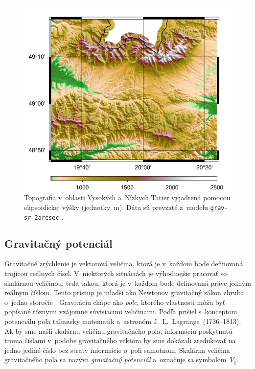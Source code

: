 \documentclass[a4paper, 12pt]{book}
\newcommand{\gidx}{\mathrm g}
\begin{document}
\begin{figure}
\centering
\includegraphics{./fig-h-grav-sr-2arcsec.pdf}
\caption{Topografia v~oblasti Vysokých a~Nízkych Tatier vyjadrená pomocou 
elipsoidickej výšky (jednotky~m).  Dáta sú prevzaté z~modelu 
\texttt{grav-sr-2arcsec} \parencite{GravSR2arcsec}.}
\label{fig:h_grav_sr_2arcsec}
\end{figure}







\newpage
\subsection{Gravitačný potenciál}
\label{sec:vg}

Gravitačné zrýchlenie je vektorová veličina, ktorá je v~každom bode definovaná 
trojicou reálnych čísel.  V~niektorých situáciách je výhodnejšie pracovať so 
skalárnou veličinou, teda takou, ktorá je v~každom bode definovaná práve jedným 
reálnym číslom.  Tento prístup je mladší ako Newtonov gravitačný zákon zhruba 
o~jedno storočie \parencite{MacMillan1930,Jekeli2015}.  Gravitáciu chápe ako 
\emph{pole}, ktorého vlastnosti môžu byť popísané rôznymi vzájomne súvisiacimi 
veličinami.  Podľa \textcite{MacMillan1930} prišiel s~konceptom potenciálu poľa 
taliansky matematik a~astronóm J.~L.~Lagrange~(1736--1813).  Ak by sme našli 
skalárnu veličinu gravitačného poľa, informáciu poskytnutú troma číslami 
v~podobe gravitačného vektora by sme dokázali zredukovať na jedno jediné číslo 
bez straty informácie o~poli samotnom.  Skalárna veličina gravitačného poľa sa 
nazýva \emph{gravitačný potenciál} a~označuje sa symbolom~$V_\gidx$.
\end{document}
